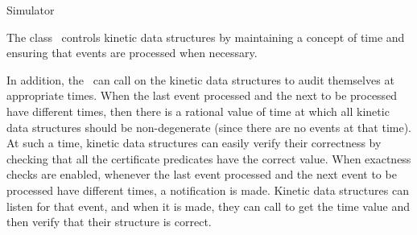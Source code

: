 

\begin{ccRefConcept}{Simulator}  %


\ccDefinition
  
The class \ccRefName\ controls kinetic data structures by maintaining
a concept of time and ensuring that events are processed when
necessary. 

In addition, the \ccRefName\ can call on the kinetic data structures
to audit themselves at appropriate times. When the last event
processed and the next to be processed have different times, then
there is a rational value of time at which all kinetic data structures
should be non-degenerate (since there are no events at that time). At
such a time, kinetic data structures can easily verify their
correctness by checking that all the certificate predicates have the
correct value. When exactness checks are enabled, whenever the last
event processed and the next event to be processed have different
times, a
 notification is made. Kinetic
data structures can listen for that event, and when it is made, they
can call  to get the time value and
then verify that their structure is correct.


\ccTypes





\end{ccRefConcept}
